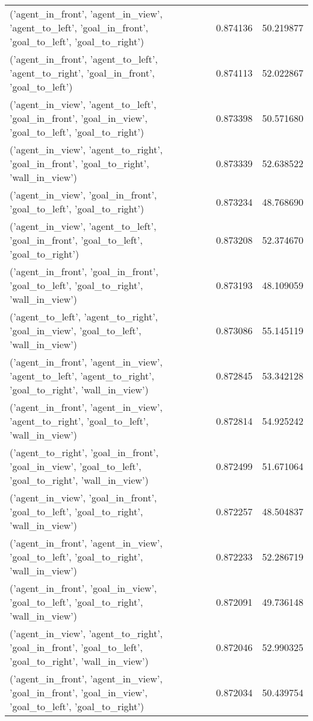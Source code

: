 \begin{tabular}{lrr}
('agent\_in\_front', 'agent\_in\_view', 'agent\_to\_left', 'goal\_in\_front', 'goal\_to\_left', 'goal\_to\_right') & 0.874136 & 50.219877 \\
('agent\_in\_front', 'agent\_to\_left', 'agent\_to\_right', 'goal\_in\_front', 'goal\_to\_left') & 0.874113 & 52.022867 \\
('agent\_in\_view', 'agent\_to\_left', 'goal\_in\_front', 'goal\_in\_view', 'goal\_to\_left', 'goal\_to\_right') & 0.873398 & 50.571680 \\
('agent\_in\_view', 'agent\_to\_right', 'goal\_in\_front', 'goal\_to\_right', 'wall\_in\_view') & 0.873339 & 52.638522 \\
('agent\_in\_view', 'goal\_in\_front', 'goal\_to\_left', 'goal\_to\_right') & 0.873234 & 48.768690 \\
('agent\_in\_view', 'agent\_to\_left', 'goal\_in\_front', 'goal\_to\_left', 'goal\_to\_right') & 0.873208 & 52.374670 \\
('agent\_in\_front', 'goal\_in\_front', 'goal\_to\_left', 'goal\_to\_right', 'wall\_in\_view') & 0.873193 & 48.109059 \\
('agent\_to\_left', 'agent\_to\_right', 'goal\_in\_view', 'goal\_to\_left', 'wall\_in\_view') & 0.873086 & 55.145119 \\
('agent\_in\_front', 'agent\_in\_view', 'agent\_to\_left', 'agent\_to\_right', 'goal\_to\_right', 'wall\_in\_view') & 0.872845 & 53.342128 \\
('agent\_in\_front', 'agent\_in\_view', 'agent\_to\_right', 'goal\_to\_left', 'wall\_in\_view') & 0.872814 & 54.925242 \\
('agent\_to\_right', 'goal\_in\_front', 'goal\_in\_view', 'goal\_to\_left', 'goal\_to\_right', 'wall\_in\_view') & 0.872499 & 51.671064 \\
('agent\_in\_view', 'goal\_in\_front', 'goal\_to\_left', 'goal\_to\_right', 'wall\_in\_view') & 0.872257 & 48.504837 \\
('agent\_in\_front', 'agent\_in\_view', 'goal\_to\_left', 'goal\_to\_right', 'wall\_in\_view') & 0.872233 & 52.286719 \\
('agent\_in\_front', 'goal\_in\_view', 'goal\_to\_left', 'goal\_to\_right', 'wall\_in\_view') & 0.872091 & 49.736148 \\
('agent\_in\_view', 'agent\_to\_right', 'goal\_in\_front', 'goal\_to\_left', 'goal\_to\_right', 'wall\_in\_view') & 0.872046 & 52.990325 \\
('agent\_in\_front', 'agent\_in\_view', 'goal\_in\_front', 'goal\_in\_view', 'goal\_to\_left', 'goal\_to\_right') & 0.872034 & 50.439754 \\

\end{tabular}
